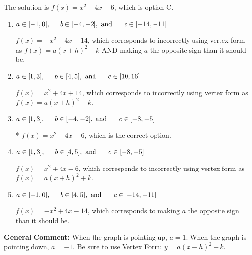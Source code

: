 \documentclass{extbook}[14pt]
\begin{document}
\begin{enumerate}
{The solution is \( f(x) = x^{2} -4 x -6 \), which is option C.\begin{enumerate}[label=\Alph*.]
\item \( a \in [-1, 0], \hspace*{5mm} b \in [-4, -2], \text{ and } \hspace*{5mm} c \in [-14, -11] \)

$f(x)=-x^{2} -4 x -14$, which corresponds to incorrectly using vertex form as $f(x) = a(x+h)^2+k$ AND making $a$ the opposite sign than it should be.
\item \( a \in [1, 3], \hspace*{5mm} b \in [4, 5], \text{ and } \hspace*{5mm} c \in [10, 16] \)

$f(x)=x^{2} +4 x + 14$, which corresponds to incorrectly using vertex form as $f(x) = a(x+h)^2 - k$.
\item \( a \in [1, 3], \hspace*{5mm} b \in [-4, -2], \text{ and } \hspace*{5mm} c \in [-8, -5] \)

* $f(x)=x^{2} -4 x -6$, which is the correct option.
\item \( a \in [1, 3], \hspace*{5mm} b \in [4, 5], \text{ and } \hspace*{5mm} c \in [-8, -5] \)

$f(x)=x^{2} +4 x -6$, which corresponds to incorrectly using vertex form as $f(x) = a(x+h)^2+k$.
\item \( a \in [-1, 0], \hspace*{5mm} b \in [4, 5], \text{ and } \hspace*{5mm} c \in [-14, -11] \)

$f(x)=-x^{2} +4 x -14$, which corresponds to making $a$ the opposite sign than it should be.
\end{enumerate}

\textbf{General Comment:} When the graph is pointing up, $a=1$. When the graph is pointing down, $a=-1$. Be sure to use Vertex Form: $y = a(x-h)^2+k$.
}
\end{enumerate}
\end{document}
